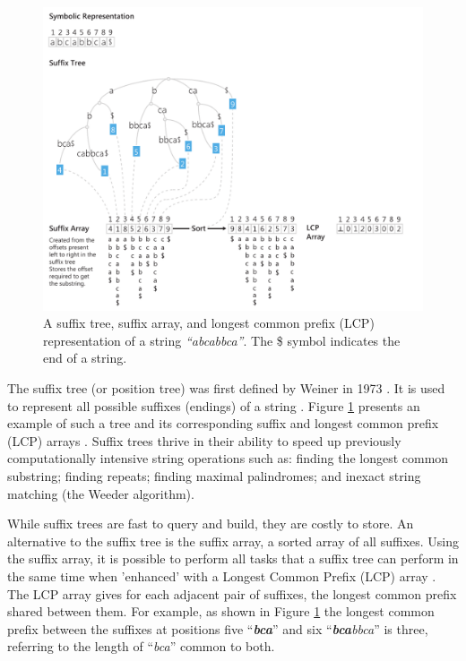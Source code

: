 \begin{figure}[!t]
\centering
\includegraphics[width=\textwidth]{images/timeseries/suffix_tree.pdf}
\caption{A suffix tree, suffix array, and longest common prefix (LCP) representation of a string \emph{``abcabbca''}.
The \$ symbol indicates the end of a string.}
\label{fig:suffix_tree}
\vspace{-10pt}
\end{figure}

The suffix tree (or position tree) was first defined by Weiner in 1973 \cite{weiner1973}.
It is used to represent all possible suffixes (endings) of a string \cite{weiner1973, ukkonen1995}.
Figure \ref{fig:suffix_tree} presents an example of such a tree and its corresponding suffix and longest common prefix (LCP) arrays \cite{kasai2001}.
Suffix trees thrive in their ability to speed up previously computationally intensive string operations such as: finding the longest common substring; finding repeats; finding maximal palindromes; and inexact string matching (the Weeder algorithm). 

While suffix trees are fast to query and build, they are costly to store.
An alternative to the suffix tree is the suffix array, a sorted array of all suffixes.
Using the suffix array, it is possible to perform all tasks that a suffix tree can perform in the same time when 'enhanced' with a Longest Common Prefix (LCP) array \cite{kasai2001, abouelhoda2004}.
The LCP array gives for each adjacent pair of suffixes, the longest common prefix shared between them.
For example, as shown in Figure \ref{fig:suffix_tree} the longest common prefix between the suffixes at positions five ``\emph{\textbf{bca}}'' and six ``\emph{\textbf{bca}bbca}'' is three, referring to the length of ``\emph{bca}'' common to both.

